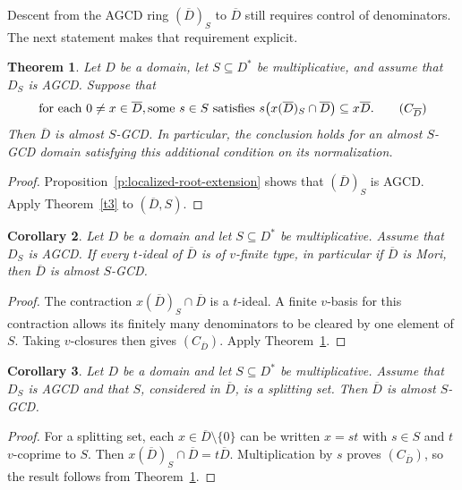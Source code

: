 \documentclass[11pt]{amsart}
\newtheorem{theorem}{Theorem}[section]
\newtheorem{corollary}[theorem]{Corollary}
\theoremstyle{definition}
\theoremstyle{remark}
\begin{document}
Descent from the AGCD ring $(\overline D)_S$ to $\overline D$
still requires control of denominators. The next statement makes
that requirement explicit.

\begin{theorem}\label{t:integral-closure-descent}
Let $D$ be a domain, let $S\subseteq D^\ast$ be multiplicative,
and assume that $D_S$ is AGCD. Suppose that
\[
 \text{for each }0\ne x\in\overline D, \text{some }s\in S
 \text{ satisfies }
 s\bigl(x(\overline D)_S\cap\overline D\bigr)
 \subseteq x\overline D.\tag{$C_{\overline D}$}
\]
Then $\overline D$ is almost $S$-GCD. In particular, the conclusion
holds for an almost $S$-GCD domain satisfying this additional
condition on its normalization.
\end{theorem}
\begin{proof}
Proposition~\ref{p:localized-root-extension} shows that
$(\overline D)_S$ is AGCD. Apply Theorem~\ref{t3} to
$(\overline D,S)$.
\end{proof}

\begin{corollary}\label{c:integral-closure-tfinite}
Let $D$ be a domain and let $S\subseteq D^\ast$ be multiplicative.
Assume that $D_S$ is AGCD. If every $t$-ideal of $\overline D$
is of $v$-finite type, in particular if $\overline D$ is Mori,
then $\overline D$ is almost $S$-GCD.
\end{corollary}
\begin{proof}
The contraction $x(\overline D)_S\cap\overline D$ is a $t$-ideal.
A finite $v$-basis for this contraction allows its finitely many
denominators to be cleared by one element of $S$. Taking
$v$-closures then gives $(C_{\overline D})$.
Apply Theorem~\ref{t:integral-closure-descent}.
\end{proof}

\begin{corollary}\label{c:integral-closure-splitting}
Let $D$ be a domain and let $S\subseteq D^\ast$ be multiplicative.
Assume that $D_S$ is AGCD and that $S$, considered in
$\overline D$, is a splitting set. Then $\overline D$ is
almost $S$-GCD.
\end{corollary}
\begin{proof}
For a splitting set, each $x\in\overline D\setminus\{0\}$ can
be written $x=st$ with $s\in S$ and $t$ $v$-coprime to $S$.
Then $x(\overline D)_S\cap\overline D=t\overline D$.
Multiplication by $s$ proves $(C_{\overline D})$, so the result
follows from Theorem~\ref{t:integral-closure-descent}.
\end{proof}
\end{document}
